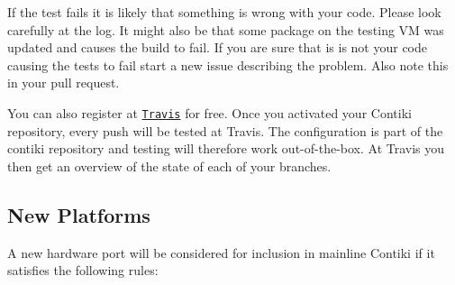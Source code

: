If the test fails it is likely that something is wrong with your code. Please look carefully at the log. It might also be that some package on the testing V\+M was updated and causes the build to fail. If you are sure that is is not your code causing the tests to fail start a new issue describing the problem. Also note this in your pull request.

You can also register at \href{https://travis-ci.org/}{\tt Travis} for free. Once you activated your Contiki repository, every push will be tested at Travis. The configuration is part of the contiki repository and testing will therefore work out-\/of-\/the-\/box. At Travis you then get an overview of the state of each of your branches.

\subsection*{New Platforms }

A new hardware port will be considered for inclusion in mainline Contiki if it satisfies the following rules\+:



